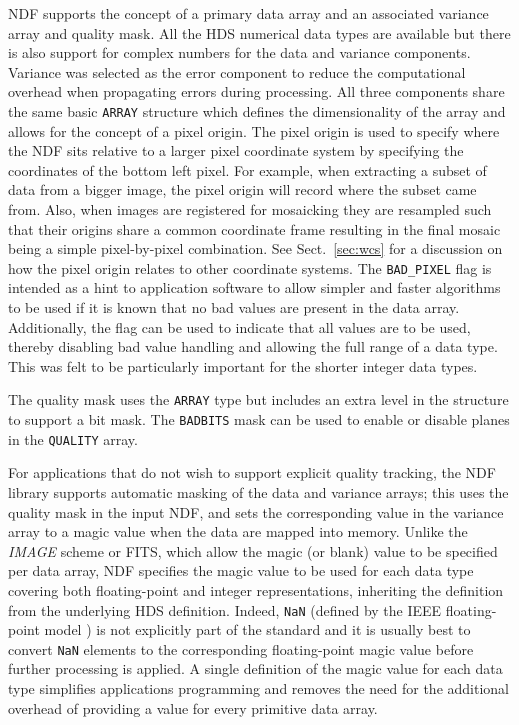 \documentclass[final,authoryear,5p,times,twocolumn]{elsarticle}
\newcommand*\secref[1]{Sect.~\ref{#1}}
\begin{document}
NDF supports the concept of a primary data array and an associated
variance array and quality mask. All the HDS numerical data types are available
but there is also support for complex numbers for the data and
variance components. Variance was selected as the error
component to reduce the computational overhead when propagating errors
during processing. All three components share the same
basic \texttt{ARRAY} structure which defines the dimensionality of the
array and allows for the concept of a pixel origin. The pixel origin
is used to specify where the NDF sits relative to a larger pixel
coordinate system by specifying the coordinates of the bottom left
pixel. For example, when extracting a subset of data from
a bigger image, the pixel origin will record where the subset came
from. Also, when images are registered for mosaicking they are
resampled such that their origins share a common coordinate frame
resulting in the final mosaic being a simple pixel-by-pixel
combination. See \secref{sec:wcs} for a discussion on how the pixel
origin relates to other coordinate systems. The
\texttt{BAD\_PIXEL} flag is intended as a hint to application
software to allow simpler and faster algorithms to be used if it is known
that no bad values are present in the data array. Additionally, the flag
can be used to indicate that all values are to be used, thereby
disabling bad value handling and allowing the full range of a data
type. This was felt to be particularly important for the shorter
integer data types.

The quality mask uses the \texttt{ARRAY} type but includes an extra
level in the structure to support a bit mask. The \texttt{BADBITS}
mask can be used to enable or disable planes in the \texttt{QUALITY} array.

For applications that do not wish to support explicit quality
tracking, the NDF library supports automatic masking of the data and
variance arrays; this uses the quality mask in the input NDF, and sets
the corresponding value in the variance array to a magic value when
the data are mapped into memory. Unlike the \emph{IMAGE} scheme
or FITS, which allow the magic (or blank) value to be specified per
data array, NDF specifies the magic value to be used for each data type
covering both floating-point and integer representations, inheriting
the definition from the underlying HDS definition. Indeed,
\texttt{NaN} (defined by the IEEE floating-point model \citep{1985-754IEEE}) is not explicitly part of the standard and it is usually
best to convert \texttt{NaN} elements to the corresponding floating-point magic
value before further processing is applied. A single definition of the
magic value for each data type simplifies applications programming and
removes the need for the additional overhead of providing a value for
every primitive data array.
\end{document}
